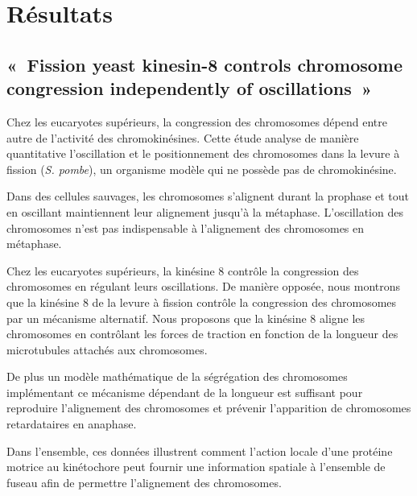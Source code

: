 \documentclass[12pt,a4paper,twoside,openright]{book}
\begin{document}
\clearpage\null

\chapter{Résultats}\label{ruxe9sultats}

\section{«~Fission yeast kinesin-8 controls chromosome congression
independently of oscillations~»}\label{sec:article}

Chez les eucaryotes supérieurs, la congression des chromosomes dépend
entre autre de l'activité des chromokinésines. Cette étude analyse de
manière quantitative l'oscillation et le positionnement des chromosomes
dans la levure à fission (\emph{S. pombe}), un organisme modèle qui ne
possède pas de chromokinésine.

Dans des cellules sauvages, les chromosomes s'alignent durant la
prophase et tout en oscillant maintiennent leur alignement jusqu'à la
métaphase. L'oscillation des chromosomes n'est pas indispensable à
l'alignement des chromosomes en métaphase.

Chez les eucaryotes supérieurs, la kinésine 8 contrôle la congression
des chromosomes en régulant leurs oscillations. De manière opposée, nous
montrons que la kinésine 8 de la levure à fission contrôle la
congression des chromosomes par un mécanisme alternatif. Nous proposons
que la kinésine 8 aligne les chromosomes en contrôlant les forces de
traction en fonction de la longueur des microtubules attachés aux
chromosomes.

De plus un modèle mathématique de la ségrégation des chromosomes
implémentant ce mécanisme dépendant de la longueur est suffisant pour
reproduire l'alignement des chromosomes et prévenir l'apparition de
chromosomes retardataires en anaphase.

Dans l'ensemble, ces données illustrent comment l'action locale d'une
protéine motrice au kinétochore peut fournir une information spatiale à
l'ensemble de fuseau afin de permettre l'alignement des chromosomes.




\end{document}
